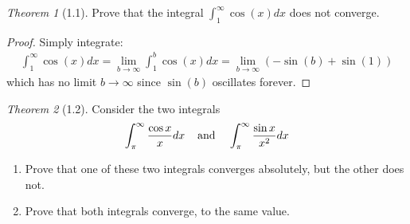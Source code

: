 \documentclass[12pt]{article}
\theoremstyle{remark}
\theoremstyle{named}
\newtheorem*{theorem}{Theorem}
\begin{document}
\begin{theorem}[1.1]
    Prove that the integral \(\int_{1}^{\infty} \cos(x)dx\) does not converge.
\end{theorem}

\begin{proof}
    Simply integrate:
    \begin{align*}
        \int_{1}^{\infty} \cos(x) dx = \lim_{b \to \infty} \int_{1}^{b} \cos(x) dx = \lim_{b \to \infty}(-\sin(b) + \sin(1))
    \end{align*}
    which has no limit \(b \to \infty\) since \(\sin(b)\) oscillates forever.
\end{proof}

\begin{theorem}[1.2]
    Consider the two integrals
    \[\int_{\pi}^{\infty}\frac{\cos x}{x}dx \hspace*{4mm} \text{and} \hspace*{4mm} \int_{\pi}^{\infty} \frac{\sin x}{x^2}dx\]
    \begin{enumerate}
        \item Prove that one of these two integrals converges absolutely, but the other does not.
        \item Prove that both integrals converge, to the same value.
    \end{enumerate}
\end{theorem}
\end{document}
